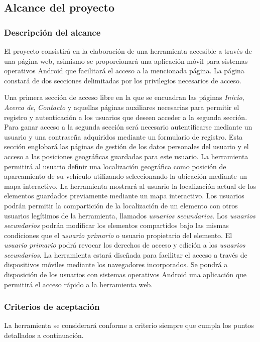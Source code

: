 	\subsection{Alcance del proyecto}
		\subsubsection{Descripción del alcance}
		\label{descripcion-alcance}
		El proyecto consistirá en la elaboración de una herramienta accesible a través de una página web, asimismo se proporcionará una aplicación móvil para sistemas operativos Android que facilitará el acceso a la mencionada página.
		La página constará de dos secciones delimitadas por los privilegios necesarios de acceso. 
		
		Una primera sección de acceso libre en la que se encuadran las páginas \textit{Inicio}, \textit{Acerca de}, \textit{Contacto} y aquellas páginas auxiliares necesarias para permitir el registro y autenticación a los usuarios que deseen acceder a la segunda sección.
		Para ganar acceso a la segunda sección será necesario autentificarse mediante un usuario y una contraseña adquiridos mediante un formulario de registro. Esta sección englobará las páginas de gestión de los datos personales del usuario y el acceso a las posiciones geográficas guardadas para este usuario.
		La herramienta permitirá al usuario definir una localización geográfica como posición de aparcamiento de su vehículo utilizando seleccionando la ubicación mediante un mapa interactivo.
		La herramienta mostrará al usuario la localización actual de los elementos guardados previamente mediante un mapa interactivo.
		Los usuarios podrán permitir la compartición de la localización de un elemento con otros usuarios legítimos de la herramienta, llamados \textit{usuarios secundarios}.
		Los \textit{usuarios secundarios} podrán modificar los elementos compartidos bajo las mismas condiciones que el \textit{usuario primario} o usuario propietario del elemento.
		El \textit{usuario primario} podrá revocar los derechos de acceso y edición a los \textit{usuarios secundarios}.
		La herramienta estará diseñada para facilitar el acceso a través de dispositivos móviles mediante los navegadores incorporados.
		Se pondrá a disposición de los usuarios con sistemas operativos Android una aplicación que permitirá el acceso rápido a la herramienta web.
	
		\subsubsection{Criterios de aceptación}
		\label{criterios-aceptacion}
		La herramienta se considerará conforme a criterio siempre que cumpla los puntos detallados a continuación.
		
